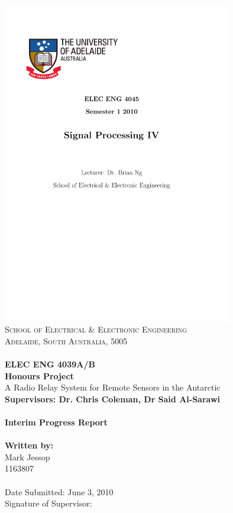\documentclass[a4paper,12pt]{article}
\begin{document}
\thispagestyle{empty}
\vspace*{\fill}
\includegraphics[width=10cm]{./UofAlogo.pdf}\\
\noindent
\textsc{
\textsc{School of Electrical \& Electronic Engineering}\\
Adelaide, South Australia, 5005\\ \\
}
\noindent
\Large{\textbf{
ELEC ENG 4039A/B \\
Honours Project\\
	}}
	\Large{
		A Radio Relay System for Remote Sensors in the Antarctic \\
	}
	\small{\textbf{Supervisors: Dr. Chris Coleman, Dr Said Al-Sarawi}}
	\ \\
	\ \\
	\Large{\textbf{
		Interim Progress Report \\
	}}
	\ \\
	\small{\textbf{
		Written by: \\}
		Mark Jessop \\
		1163807
	}
	\ \\
	\ \\
	Date Submitted: June 3, 2010 \\
	Signature of Supervisor: \\
 \vspace*{\fill}
\end{document}
